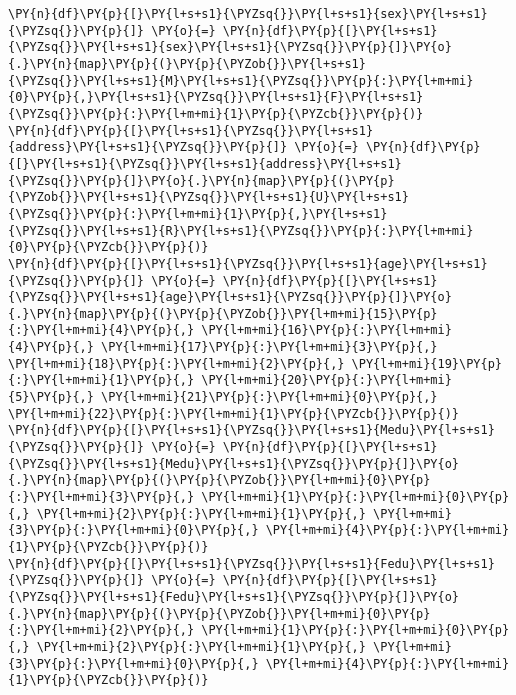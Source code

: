     \begin{tcolorbox}[breakable, size=fbox, boxrule=1pt, pad at break*=1mm,colback=cellbackground, colframe=cellborder]
\begin{Verbatim}[commandchars=\\\{\}]
\PY{n}{df}\PY{p}{[}\PY{l+s+s1}{\PYZsq{}}\PY{l+s+s1}{sex}\PY{l+s+s1}{\PYZsq{}}\PY{p}{]} \PY{o}{=} \PY{n}{df}\PY{p}{[}\PY{l+s+s1}{\PYZsq{}}\PY{l+s+s1}{sex}\PY{l+s+s1}{\PYZsq{}}\PY{p}{]}\PY{o}{.}\PY{n}{map}\PY{p}{(}\PY{p}{\PYZob{}}\PY{l+s+s1}{\PYZsq{}}\PY{l+s+s1}{M}\PY{l+s+s1}{\PYZsq{}}\PY{p}{:}\PY{l+m+mi}{0}\PY{p}{,}\PY{l+s+s1}{\PYZsq{}}\PY{l+s+s1}{F}\PY{l+s+s1}{\PYZsq{}}\PY{p}{:}\PY{l+m+mi}{1}\PY{p}{\PYZcb{}}\PY{p}{)}
\PY{n}{df}\PY{p}{[}\PY{l+s+s1}{\PYZsq{}}\PY{l+s+s1}{address}\PY{l+s+s1}{\PYZsq{}}\PY{p}{]} \PY{o}{=} \PY{n}{df}\PY{p}{[}\PY{l+s+s1}{\PYZsq{}}\PY{l+s+s1}{address}\PY{l+s+s1}{\PYZsq{}}\PY{p}{]}\PY{o}{.}\PY{n}{map}\PY{p}{(}\PY{p}{\PYZob{}}\PY{l+s+s1}{\PYZsq{}}\PY{l+s+s1}{U}\PY{l+s+s1}{\PYZsq{}}\PY{p}{:}\PY{l+m+mi}{1}\PY{p}{,}\PY{l+s+s1}{\PYZsq{}}\PY{l+s+s1}{R}\PY{l+s+s1}{\PYZsq{}}\PY{p}{:}\PY{l+m+mi}{0}\PY{p}{\PYZcb{}}\PY{p}{)}
\PY{n}{df}\PY{p}{[}\PY{l+s+s1}{\PYZsq{}}\PY{l+s+s1}{age}\PY{l+s+s1}{\PYZsq{}}\PY{p}{]} \PY{o}{=} \PY{n}{df}\PY{p}{[}\PY{l+s+s1}{\PYZsq{}}\PY{l+s+s1}{age}\PY{l+s+s1}{\PYZsq{}}\PY{p}{]}\PY{o}{.}\PY{n}{map}\PY{p}{(}\PY{p}{\PYZob{}}\PY{l+m+mi}{15}\PY{p}{:}\PY{l+m+mi}{4}\PY{p}{,} \PY{l+m+mi}{16}\PY{p}{:}\PY{l+m+mi}{4}\PY{p}{,} \PY{l+m+mi}{17}\PY{p}{:}\PY{l+m+mi}{3}\PY{p}{,} \PY{l+m+mi}{18}\PY{p}{:}\PY{l+m+mi}{2}\PY{p}{,} \PY{l+m+mi}{19}\PY{p}{:}\PY{l+m+mi}{1}\PY{p}{,} \PY{l+m+mi}{20}\PY{p}{:}\PY{l+m+mi}{5}\PY{p}{,} \PY{l+m+mi}{21}\PY{p}{:}\PY{l+m+mi}{0}\PY{p}{,} \PY{l+m+mi}{22}\PY{p}{:}\PY{l+m+mi}{1}\PY{p}{\PYZcb{}}\PY{p}{)}
\PY{n}{df}\PY{p}{[}\PY{l+s+s1}{\PYZsq{}}\PY{l+s+s1}{Medu}\PY{l+s+s1}{\PYZsq{}}\PY{p}{]} \PY{o}{=} \PY{n}{df}\PY{p}{[}\PY{l+s+s1}{\PYZsq{}}\PY{l+s+s1}{Medu}\PY{l+s+s1}{\PYZsq{}}\PY{p}{]}\PY{o}{.}\PY{n}{map}\PY{p}{(}\PY{p}{\PYZob{}}\PY{l+m+mi}{0}\PY{p}{:}\PY{l+m+mi}{3}\PY{p}{,} \PY{l+m+mi}{1}\PY{p}{:}\PY{l+m+mi}{0}\PY{p}{,} \PY{l+m+mi}{2}\PY{p}{:}\PY{l+m+mi}{1}\PY{p}{,} \PY{l+m+mi}{3}\PY{p}{:}\PY{l+m+mi}{0}\PY{p}{,} \PY{l+m+mi}{4}\PY{p}{:}\PY{l+m+mi}{1}\PY{p}{\PYZcb{}}\PY{p}{)}
\PY{n}{df}\PY{p}{[}\PY{l+s+s1}{\PYZsq{}}\PY{l+s+s1}{Fedu}\PY{l+s+s1}{\PYZsq{}}\PY{p}{]} \PY{o}{=} \PY{n}{df}\PY{p}{[}\PY{l+s+s1}{\PYZsq{}}\PY{l+s+s1}{Fedu}\PY{l+s+s1}{\PYZsq{}}\PY{p}{]}\PY{o}{.}\PY{n}{map}\PY{p}{(}\PY{p}{\PYZob{}}\PY{l+m+mi}{0}\PY{p}{:}\PY{l+m+mi}{2}\PY{p}{,} \PY{l+m+mi}{1}\PY{p}{:}\PY{l+m+mi}{0}\PY{p}{,} \PY{l+m+mi}{2}\PY{p}{:}\PY{l+m+mi}{1}\PY{p}{,} \PY{l+m+mi}{3}\PY{p}{:}\PY{l+m+mi}{0}\PY{p}{,} \PY{l+m+mi}{4}\PY{p}{:}\PY{l+m+mi}{1}\PY{p}{\PYZcb{}}\PY{p}{)}

\end{Verbatim}
\end{tcolorbox}
